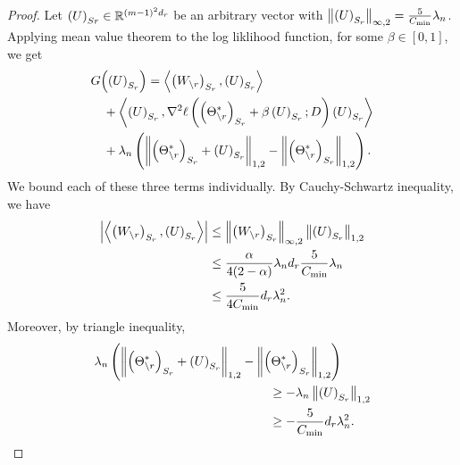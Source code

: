 \begin{proof}
\noindent Let $\left(U\right)_{Sr}\in\mathbb{R}^{(m-1)^2d_{r}}$ be an arbitrary vector with \footnotesize$\left\|\left(U\right)_{S_{r}}\right\|_{\infty,2}=\frac{5}{C_{\min}}\lambda_n$\normalsize.  Applying mean value theorem to the log liklihood function, for some $\beta\in[0,1]$, we get
\begin{equation}
\begin{aligned}
&G\Big(\!\left(U\right)_{S_{r}}\!\Big) =\left<\left(W_{\backslash r}\right)_{S_{r}},\left(U\right)_{S_{r}}\right>\\ &\quad+ \left<\left(U\right)_{S_{r}},\nabla^2\ell\left(\left(\Theta^*_{\backslash r}\right)_{S_{r}}+\beta\left(U\right)_{S_{r}};D\right) \left(U\right)_{S_{r}}\right> \\ &\quad+\lambda_n\left(\left\|\left(\Theta^*_{\backslash r}\right)_{S_{r}}+\left(U\right)_{S_{r}}\right\|_{1,2} -\left\|\left(\Theta^*_{\backslash r}\right)_{S_{r}}\right\|_{1,2}\right).
\end{aligned}
\label{Gu_Eqn}
\end{equation}
We bound each of these three terms individually. By Cauchy-Schwartz inequality, we have
\begin{equation}
\begin{aligned}
\left|\left<\left(W_{\backslash r}\right)_{S_{r}},\left(U\right)_{S_{r}}\right>\right| &\leq\left\|\left(W_{\backslash r}\right)_{S_{r}}\right\|_{\infty,2} \left\|\left(U\right)_{S_{r}}\right\|_{1,2}\\
&\leq\frac{\alpha}{4(2-\alpha)}\lambda_n d_{r} \frac{5}{C_{\min}}\lambda_n\\
&\leq\frac{5}{4C_{\min}} d_{r} \lambda_n^2.
\end{aligned}
\nonumber
\end{equation}
Moreover, by triangle inequality,
\begin{equation}
\begin{aligned}
&\regpar_n\left(\norm{\left(\Theta^*_{\backslash\svert}\right)_{\support_\svert}+\left(U\right)_{\support_\svert}}{1,2} -\norm{\left(\Theta^*_{\backslash\svert}\right)_{\support_\svert}}{1,2}\right)\\ &\qquad\qquad\qquad\qquad\qquad\qquad\qquad\geq -\regpar_n \norm{\left(U\right)_{\support_\svert}}{1,2}\\
&\qquad\qquad\qquad\qquad\qquad\qquad\qquad\geq -\frac{5}{C_{\min}} d_\svert \regpar_n^2.
\end{aligned}

\end{equation}
\end{proof}

